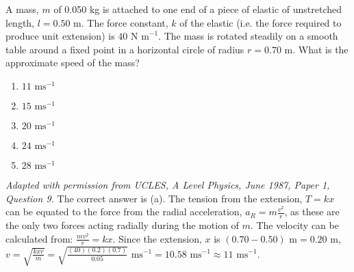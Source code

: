 
\begin{problem}[A1987PIQ9l] 
{A mass, $m$ of 0.050 kg is attached to one end of a piece of elastic of unstretched length, $l = 0.50 \textrm{ m}$. The force constant, $k$ of the elastic (i.e. the force required to produce unit extension) is $40 \textrm{ N m}^{-1}$. The mass is rotated steadily on a smooth table around a fixed point in a horizontal circle of radius $r =0.70 \textrm{ m}$.
What is the approximate speed of the mass?
\begin{enumerate}
	\item $11 \textrm{ ms}^{-1}$ \answer
	\item $15 \textrm{ ms}^{-1}$
	\item $20 \textrm{ ms}^{-1}$
	\item $24 \textrm{ ms}^{-1}$
	\item $28 \textrm{ ms}^{-1}$
\end{enumerate}}
{\textit{Adapted with permission from UCLES, A Level Physics, June 1987, Paper 1, Question 9.}}
{The correct answer is (a). The tension from the extension, $T = kx$ can be equated to the force from the radial acceleration, $a_{R} = m\frac{v^{2}}{r}$, as these are the only two forces acting radially during the motion of $m$. The velocity can be calculated from: $\frac{mv^{2}}{r} = kx$. Since the extension, $x$ is $(0.70 - 0.50) \textrm{ m} = 0.20 \textrm{ m}$, $v = \sqrt{\frac{kxr}{m}} = \sqrt{\frac{(40)(0.2)(0.7)}{0.05}} \textrm{ ms}^{-1}= 10.58 \textrm{ ms}^{-1} \approx 11 \textrm{ ms}^{-1}$.}
\end{problem}